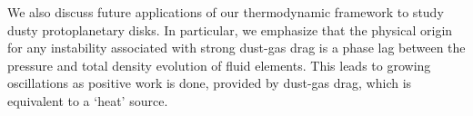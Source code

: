 
We also discuss future applications of our thermodynamic framework to 
study dusty protoplanetary disks. In particular, we emphasize  that the 
physical origin for any instability associated with strong dust-gas
drag is a phase lag between the pressure and total density evolution
of fluid elements. This leads to growing oscillations as positive work
is done, provided by dust-gas drag, which is equivalent to a `heat'
source. %
 
